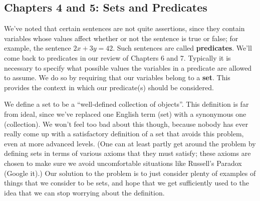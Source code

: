 \documentclass[letterpaper,12pt]{article}
\begin{document}


\subsection*{Chapters 4 and 5: Sets and Predicates}
We've noted that certain sentences are not quite assertions, since they contain variables whose values affect whether or not the sentence is true or false; for example, the sentence $2x+3y=42$. Such sentences are called {\bf predicates}. We'll come back to predicates in our review of Chapters 6 and 7. Typically it is necessary to specify what possible values the variables in a predicate are allowed to assume. We do so by requiring that our variables belong to a {\bf set}. This provides the context in which our predicate(s) should be considered.

We define a set to be a ``well-defined collection of objects''. This definition is far from ideal, since we've replaced one English term (set) with a synonymous one (collection). We won't feel too bad about this though, because nobody has ever really come up with a satisfactory definition of a set that avoids this problem, even at more advanced levels. (One can at least partly get around the problem by defining sets in terms of various axioms that they must satisfy; these axioms are chosen to make sure we avoid uncomfortable situations like Russell's Paradox (Google it).) Our solution to the problem is to just consider plenty of examples of things that we consider to be sets, and hope that we get sufficiently used to the idea that we can stop worrying about the definition.
\end{document}
